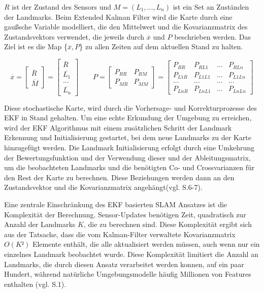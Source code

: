 \( R\) ist der Zustand des Sensors und \( M = (L_1, ..., L_n)\) ist ein Set an Zuständen der Landmarks.
Beim Extended Kalman Filter wird die Karte durch eine gaußsche Variable modelliert, die den Mittelwert und die Kovarianzmatrix des Zustandsvektors verwendet, die jeweils durch \(\overline{x}\) und \(P\) beschrieben werden. Das Ziel ist es die Map \{\(\overline{x}, P\)\} zu allen Zeiten auf dem aktuellen Stand zu halten.


\begin{equation}
  \overline{x} =  
  		\begin{bmatrix}
		\overline{R}\\
		\overline{M}
     	\end{bmatrix}
     = 
     	\begin{bmatrix}
		\overline{R}\\
		\overline{L_1}\\
		...\\
		\overline{L_n}
     	\end{bmatrix}
     	\quad\quad
     P = 
     	\begin{bmatrix}
		P_{RR} & P_{RM}\\
		P_{MR} & P_{MM}
     	\end{bmatrix}
     = 
     	\begin{bmatrix}
		P_{RR} & P_{RL1} & ... & P_{RLn}\\
		P_{L1R} & P_{L1L1} & ... & P_{L1Ln}\\
		... & ... & ... & ... \\
		P_{LnR} & P_{LnL1} & ... & P_{LnLn}
     	\end{bmatrix}
\end{equation}

Diese stochastische Karte, wird durch die Vorhersage- und Korrekturprozesse des EKF in Stand gehalten. Um eine echte Erkundung der Umgebung zu erreichen, wird der EKF Algorithmus mit einem zusätzlichen Schritt der Landmark Erkennung und Initialisierung gestartet, bei dem neue Landmarks zu der Karte hinzugefügt werden. Die Landmark Initialisierung erfolgt durch eine Umkehrung der Bewertungsfunktion und der Verwendung dieser und der Ableitungsmatrix, um die beobachteten Landmarks und die benötigten Co- und Crossvarianzen für den Rest der Karte zu berechnen. Diese Beziehungen werden dann an den Zustandsvektor und die Kovarianzmatrix angehängt(vgl. \cite{ekf_slam} S.6-7).

Eine zentrale Einschränkung des EKF basierten SLAM Ansatzes ist die Komplexität der Berechnung. Sensor-Updates benötigen Zeit, quadratisch zur Anzahl der Landmarks \(K\), die zu berechnen sind. Diese Komplexität ergibt sich aus der Tatsache, dass die vom Kalman-Filter verwaltete Kovarianzmatrix \(O(K²)\) Elemente enthält, die alle aktualisiert werden müssen, auch wenn nur ein einzelnes Landmark beobachtet wurde. Diese Komplexität limitiert die Anzahl an Landmarks, die durch diesen Ansatz verarbeitet werden konnen, auf ein paar Hundert, während natürliche Umgebungsmodelle häufig Millionen von Features enthalten (vgl. \cite{ekf_problems} S.1).


